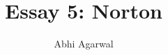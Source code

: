 \documentclass[11pt, oneside]{article}
\title{Essay 5: Norton}
\author{Abhi Agarwal}
\date{}
\begin{document}
\maketitle

\par 
\end{document}
